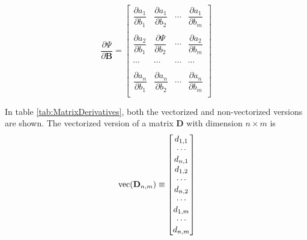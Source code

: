 \documentclass[]{article}
\def\UPS{\mbox{\boldmath $\Upsilon$}}
\def\BB{\mbox{$\mathbf B$}}	\def\bb{\mbox{$\mathbf b$}} \def\Bb{\mbox{$\mathbf J$}} \def\Ba{\mbox{$\mathbf L$}} \def\Bm{\UPS}
\def\DD{\mbox{$\mathbf D$}}	\def\dd{\mbox{$\mathbf d$}}
\def\vec{\,\textup{\textrm{vec}}}
\begin{document}
\begin{equation*}
\frac{\partial\Psi}{\partial\BB}=
\begin{bmatrix}
\dfrac{\partial a_1}{\partial b_1}& \dfrac{\partial a_1}{\partial b_2}& \cdots& \dfrac{\partial a_1}{\partial b_m}\\
\\
\dfrac{\partial a_2}{\partial b_1}& \dfrac{\partial\Psi}{\partial b_2}& \cdots& \dfrac{\partial a_2}{\partial b_m}\\
\\
\cdots&  \cdots&  \cdots&  \cdots\\
\\
\dfrac{\partial a_n}{\partial b_1}& \dfrac{\partial a_n}{\partial b_2}& \cdots& \dfrac{\partial a_n}{\partial b_m}\\
\end{bmatrix}
\end{equation*}  

In table \ref{tab:MatrixDerivatives}, both the vectorized and non-vectorized versions are shown. The vectorized version of a matrix $\DD$ with dimension $n \times m$ is
\begin{gather*}
\vec(\DD_{n,m})\equiv
\begin{bmatrix}
d_{1,1}\\
\cdots\\
d_{n,1}\\
d_{1,2}\\
\cdots\\
d_{n,2}\\
\cdots\\
d_{1,m}\\
\cdots\\
d_{n,m}
\end{bmatrix}\\
\end{gather*}
\end{document}
